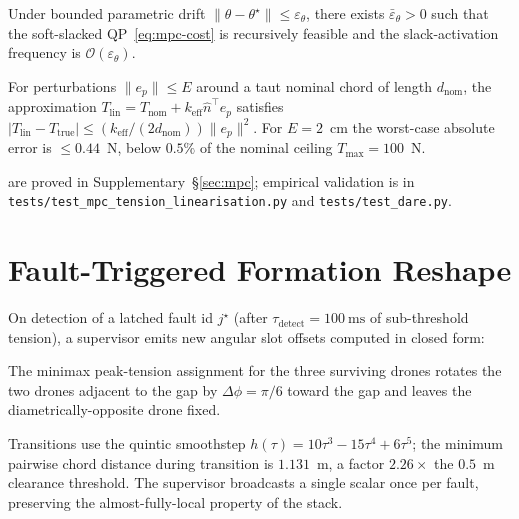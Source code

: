 \documentclass[journal,twocolumn,10pt]{IEEEtran}
\begin{document}
\begin{theorem}\label{thm:mpc}
Under bounded parametric drift $\lVert\theta-\theta^\star\rVert\le
\varepsilon_\theta$, there exists $\bar\varepsilon_\theta>0$ such that
the soft-slacked QP~\eqref{eq:mpc-cost} is recursively feasible and
the slack-activation frequency is
$\mathcal O(\varepsilon_\theta)$.
\end{theorem}

\begin{theorem}\label{thm:lin}
For perturbations $\lVert e_p\rVert \le E$ around a taut nominal
chord of length $d_\text{nom}$, the approximation
$T_\text{lin}=T_\text{nom}+k_\text{eff}\hat n^\top e_p$ satisfies
$|T_\text{lin}-T_\text{true}|\le (k_\text{eff}/(2d_\text{nom}))\lVert
e_p\rVert^2$. For $E=2$~cm the worst-case absolute error is
$\le 0.44$~N, below $0.5\%$ of the nominal ceiling
$T_\text{max}=100$~N.
\end{theorem}

 are proved in Supplementary~§\ref{sec:mpc};
empirical validation is in
\texttt{tests/test\_mpc\_tension\_linearisation.py} and
\texttt{tests/test\_dare.py}.

\section{Fault-Triggered Formation Reshape}
\label{sec:reshape}

On detection of a latched fault id $j^\star$ (after
$\tau_\text{detect}=100~\si{\milli\second}$ of sub-threshold tension),
a supervisor emits new angular slot offsets computed in closed form:

\begin{theorem}[Tension-optimal reshape for $N=4\to M=3$]
\label{thm:reshape}
The minimax peak-tension assignment for the three surviving drones
rotates the two drones adjacent to the gap by $\Delta\phi=\pi/6$
toward the gap and leaves the diametrically-opposite drone fixed.
\end{theorem}

Transitions use the quintic smoothstep
$h(\tau)=10\tau^3-15\tau^4+6\tau^5$; the minimum pairwise chord
distance during transition is $1.131$~m, a factor $2.26\times$ the
$0.5$~m clearance threshold. The supervisor broadcasts a single
scalar once per fault, preserving the almost-fully-local property of
the stack.

\end{document}
